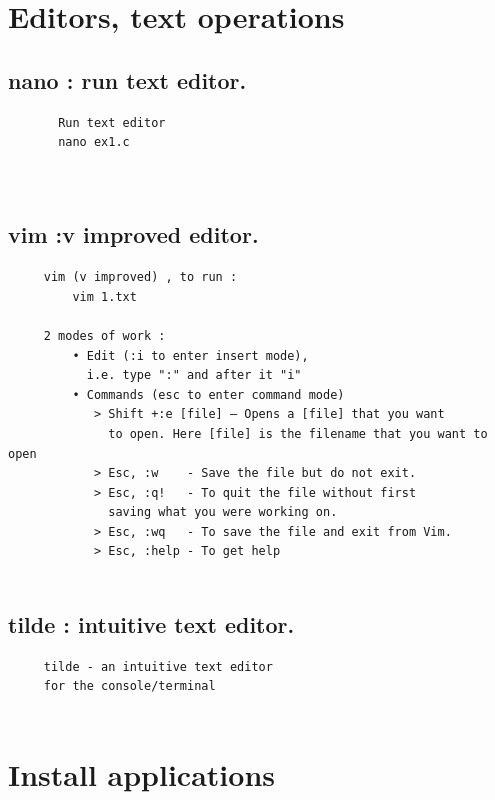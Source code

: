 \documentclass[a4paper,12pt]{article}
\begin{document}
\section{Editors, text operations}

\subsection{nano  : run text editor.}
\begin{verbatim}
       Run text editor
       nano ex1.c

       
\end{verbatim}

\subsection{vim      :v improved editor.}
\begin{verbatim}
     vim (v improved) , to run :
         vim 1.txt 
 
     2 modes of work : 
         • Edit (:i to enter insert mode),  
           i.e. type ":" and after it "i"
         • Commands (esc to enter command mode)
            > Shift +:e [file] – Opens a [file] that you want
              to open. Here [file] is the filename that you want to open
            > Esc, :w    - Save the file but do not exit.
            > Esc, :q!   - To quit the file without first
              saving what you were working on.
            > Esc, :wq   - To save the file and exit from Vim.
            > Esc, :help - To get help
 
\end{verbatim} 


\subsection{tilde      : intuitive text editor.}
\begin{verbatim}
     tilde - an intuitive text editor
     for the console/terminal
 
\end{verbatim} 

\section{Install applications}
\end{document}
